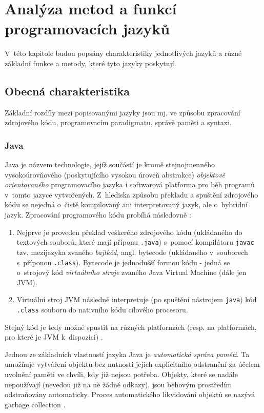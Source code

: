 \documentclass[onepage, a4paper, 12pt]{bakalarka}
\begin{document}
\chapter{Analýza metod a funkcí programovacích jazyků}
V~této kapitole budou popsány charakteristiky jednotlivých jazyků a různé základní funkce a metody, které tyto jazyky poskytují. 

\section{Obecná charakteristika}
Základní rozdíly mezi popisovanými jazyky jsou mj. ve způsobu zpracování zdrojového kódu, programovacím paradigmatu, správě paměti a syntaxi.

\subsection{Java}
Java je názvem technologie, jejíž součástí je kromě stejnojmenného vysokoúrovňového (poskytujícího vysokou úroveň abstrakce) \textit{objektově orientovaného} programovacího jazyka i softwarová platforma pro běh programů v~tomto jazyce vytvořených. Z~hlediska způsobu překladu a spuštění zdrojového kódu se nejedná o~čistě kompilovaný ani interpretovaný jazyk, ale o~hybridní jazyk. Zpracování programového kódu probíhá následovně \cite{java-book, java-guide-vm, java-guide-javac, java-guide-java}:
\begin{enumerate}
\item Nejprve je proveden překlad veškerého zdrojového kódu (ukládaného do textových souborů, které mají příponu \texttt{.java}) s~pomocí kompilátoru \texttt{javac} tzv. mezijazyka zvaného \textit{bajtkód}, angl. bytecode (ukládaného v~souborech s~příponou \texttt{.class}). Bytecode je jednodušší formou kódu - jedná se o~strojový kód \textit{virtuálního stroje} zvaného Java Virtual Machine (dále jen JVM). 
\item Virtuální stroj JVM následně interpretuje (po spuštění nástrojem \texttt{java}) kód \texttt{.class} souboru do nativního kódu cílového procesoru. 
\end{enumerate}
Stejný kód je tedy možné spustit na různých platformách (resp. na platformách, pro které je JVM k~dispozici) \cite{java-book}.\par
Jednou ze základních vlastností jazyka Java je \textit{automatická správa paměti}. Ta umožňuje vytváření objektů bez nutnosti jejich explicitního odstranění za účelem uvolnění paměti ve chvíli, kdy již nejsou potřeba. Objekty, které se nadále nepoužívají (nevedou již na ně žádné odkazy), jsou běhovým prostředím odstraňovány automaticky. Proces automatického likvidování objektů se nazývá garbage collection \cite{java-book, java-guide-vm}.
\end{document}
